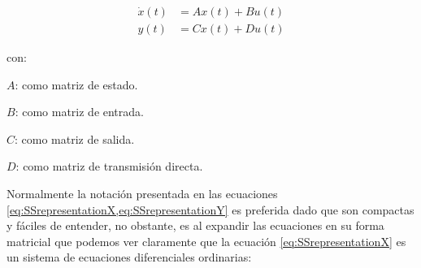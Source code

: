 			\begin{align}
                \dot{x}(t) &= Ax(t) + Bu(t) \label{eq:SSrepresentationX} \\
				y(t) &= Cx(t) + Du(t) \label{eq:SSrepresentationY}
			\end{align}
			
			\begin{spacing}{1.5}
				con: 
				
				$A$: como matriz de estado.
				
				$B$: como matriz de entrada.
				
				$C$: como matriz de salida.
				
				$D$: como matriz de transmisión directa.
				
            \end{spacing}
            
            Normalmente la notación presentada en las ecuaciones \cref{eq:SSrepresentationX,eq:SSrepresentationY} es preferida dado que son compactas y fáciles de entender, no obstante, es al expandir las ecuaciones en su forma matricial que podemos ver claramente que la ecuación \cref{eq:SSrepresentationX} es un sistema de ecuaciones diferenciales ordinarias:
            
